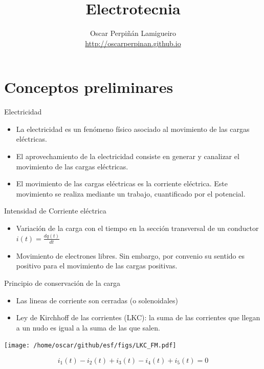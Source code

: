 \documentclass[xcolor={usenames,svgnames,dvipsnames}]{beamer}
\author{Oscar Perpiñán Lamigueiro \\ \url{http://oscarperpinan.github.io}}
\date{}
\title{Electrotecnia}
\begin{document}
\maketitle

\section{Conceptos preliminares}
\label{sec:org479344b}

\begin{frame}[label={sec:org1c310f8}]{Electricidad}
\begin{itemize}
\item La electricidad es un fenómeno físico asociado al \alert{movimiento de las
cargas eléctricas}.

\item El aprovechamiento de la electricidad consiste en generar y canalizar
el movimiento de las cargas eléctricas.

\item El movimiento de las cargas eléctricas es la \alert{corriente eléctrica}.
Este movimiento se realiza mediante un trabajo, cuantificado por el
\alert{potencial}.
\end{itemize}
\end{frame}

\begin{frame}[label={sec:orgea959ed}]{Intensidad de Corriente eléctrica}
\begin{itemize}
\item \alert{Variación de la carga con el tiempo en la sección transversal de un
conductor} \(i(t)=\frac{dq(t)}{dt}\)

\item Movimiento de electrones libres. Sin embargo, por convenio su sentido
es positivo para el movimiento de las cargas positivas.
\end{itemize}
\end{frame}

\begin{frame}[label={sec:org260de25}]{Principio de conservación de la carga}
\begin{itemize}
\item Las lineas de corriente son cerradas (o solenoidales)

\item \alert{Ley de Kirchhoff de las corrientes (LKC)}: la suma de las corrientes
que llegan a un nudo es igual a la suma de las que salen.
\end{itemize}

\begin{center}
\texttt{[image: /home/oscar/github/esf/figs/LKC\_FM.pdf]}
\end{center}

\[
i_1(t) - i_2(t) + i_3(t) - i_4(t) + i_5(t) = 0
\]
\end{frame}
\end{document}
